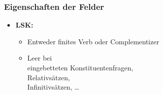 \begin{frame}
\frametitle{Eigenschaften der Felder}

\begin{itemize}
	\item \textbf{LSK:}
	\begin{itemize}
		\item Entweder finites Verb oder Complementizer
		\item Leer bei \\
		eingebetteten Konstituentenfragen, \\
		Relativsätzen, \\
		Infinitivsätzen, \dots
	\end{itemize}
\end{itemize}

\begin{table}
\centering
{}
\end{table}
	
\end{frame}


